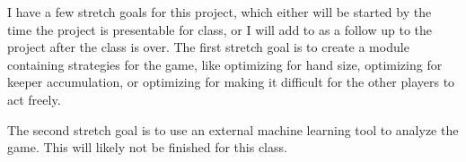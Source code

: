 \documentclass[10pt,letterpaper, twocolumn, science]{revtex4}
\begin{document}
I have a few stretch goals for this project, which either will be started by the time the project is presentable for class, or I will add to as a follow up to the project after the class is over. The first stretch goal is to create a module containing strategies for the game, like optimizing for hand size, optimizing for keeper accumulation, or optimizing for making it difficult for the other players to act freely.

The second stretch goal is to use an external machine learning tool to analyze the game. This will likely not be finished for this class.


\end{document}
